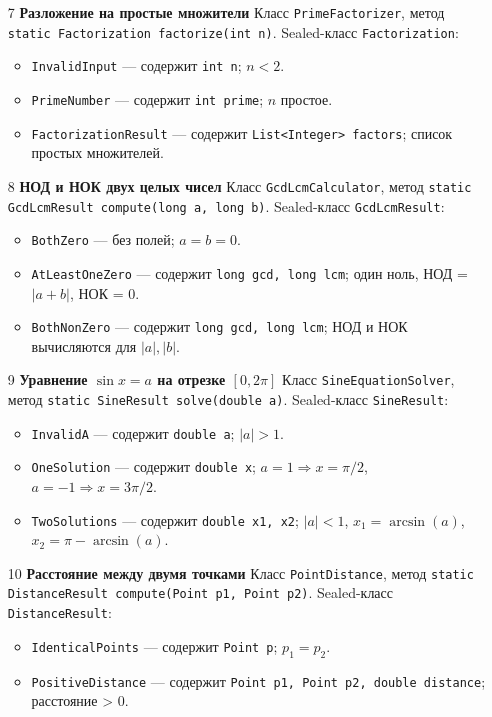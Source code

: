 \documentclass[12pt]{article}
\begin{document}
\begin{enumerate}
\item[7] \textbf{Разложение на простые множители}
Класс \texttt{PrimeFactorizer}, метод
\texttt{static Factorization factorize(int n)}.
Sealed-класс \texttt{Factorization}:
\begin{itemize}
\item \texttt{InvalidInput} — содержит \texttt{int n}; \(n < 2\).
\item \texttt{PrimeNumber} — содержит \texttt{int prime}; \(n\) простое.
\item \texttt{FactorizationResult} — содержит \texttt{List<Integer> factors}; список простых множителей.
\end{itemize}

\item[8] \textbf{НОД и НОК двух целых чисел}
Класс \texttt{GcdLcmCalculator}, метод
\texttt{static GcdLcmResult compute(long a, long b)}.
Sealed-класс \texttt{GcdLcmResult}:
\begin{itemize}
\item \texttt{BothZero} — без полей; \(a = b = 0\).
\item \texttt{AtLeastOneZero} — содержит \texttt{long gcd, long lcm}; один ноль, НОД = \(|a + b|\), НОК = 0.
\item \texttt{BothNonZero} — содержит \texttt{long gcd, long lcm}; НОД и НОК вычисляются для \(|a|, |b|\).
\end{itemize}

\item[9] \textbf{Уравнение \(\sin x = a\) на отрезке \([0, 2\pi]\)}
Класс \texttt{SineEquationSolver}, метод
\texttt{static SineResult solve(double a)}.
Sealed-класс \texttt{SineResult}:
\begin{itemize}
\item \texttt{InvalidA} — содержит \texttt{double a}; \(|a| > 1\).
\item \texttt{OneSolution} — содержит \texttt{double x}; \(a = 1 \Rightarrow x = \pi/2\), \(a = -1 \Rightarrow x = 3\pi/2\).
\item \texttt{TwoSolutions} — содержит \texttt{double x1, x2}; \(|a| < 1\), \(x_1 = \arcsin(a)\), \(x_2 = \pi - \arcsin(a)\).
\end{itemize}

\item[10] \textbf{Расстояние между двумя точками}
Класс \texttt{PointDistance}, метод
\texttt{static DistanceResult compute(Point p1, Point p2)}.
Sealed-класс \texttt{DistanceResult}:
\begin{itemize}
\item \texttt{IdenticalPoints} — содержит \texttt{Point p}; \(p_1 = p_2\).
\item \texttt{PositiveDistance} — содержит \texttt{Point p1, Point p2, double distance}; расстояние > 0.
\end{itemize}


\end{enumerate}
\end{document}
